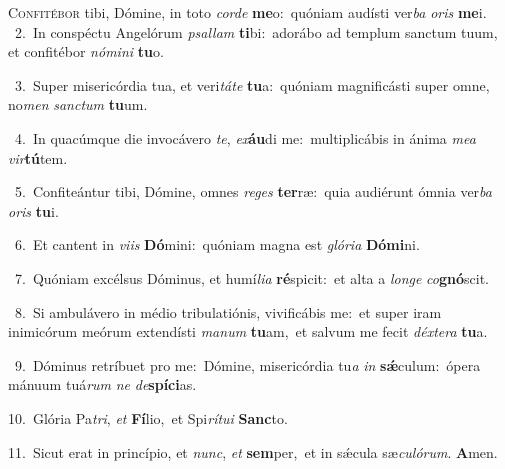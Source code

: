 \lettrine{\initial\textcolor{\initialcolor}{C}}{onfitébor} tibi, Dómine, in toto \textit{cor}\-\textit{de} \textbf{me}\-o:~\star quóniam audísti ver\textit{ba} \textit{o}\-\textit{ris} \textbf{me}\-i.\\
{\numbfont\textcolor{\numbcolor}{~2.}}~In conspéctu Angelórum \textit{psal}\-\textit{lam} \textbf{ti}\-bi:~\star adorábo ad templum sanctum tuum, et confitébor \textit{nó}\-\textit{mi}\textit{ni} \textbf{tu}\-o.\par
{\numbfont\textcolor{\numbcolor}{~3.}}~Super misericórdia tua, et veri\-\textit{tá}\-\textit{te} \textbf{tu}\-a:~\star quóniam magnificásti super omne, no\textit{men} \textit{sanc}\-\textit{tum} \textbf{tu}\-um.\par
{\numbfont\textcolor{\numbcolor}{~4.}}~In quacúmque die invocávero \textit{te}\-, \textit{ex}\-\textbf{áu}di me:~\star multiplicábis in ánima \textit{me}\-\textit{a} \textit{vir}\-\textbf{tú}tem.\par
{\numbfont\textcolor{\numbcolor}{~5.}}~Confiteántur tibi, Dómine, omnes \textit{re}\-\textit{ges} \textbf{ter}\-ræ:~\star quia audiérunt ómnia ver\textit{ba} \textit{o}\-\textit{ris} \textbf{tu}\-i.\par
{\numbfont\textcolor{\numbcolor}{~6.}}~Et cantent in \textit{vi}\-\textit{is} \textbf{Dó}\-mini:~\star quóniam magna est \textit{gló}\-\textit{ri}\textit{a} \textbf{Dó}\-\textbf{mi}ni.\par
{\numbfont\textcolor{\numbcolor}{~7.}}~Quóniam excélsus Dóminus, et humí\-\textit{li}\-\textit{a} \textbf{ré}\-spicit:~\star et alta a \textit{lon}\-\textit{ge} \textit{co}\-\textbf{gnó}scit.\par
{\numbfont\textcolor{\numbcolor}{~8.}}~Si ambulávero in médio tribulatiónis, vivificábis me:~\dagger et super iram inimicórum meórum extendísti \textit{ma}\-\textit{num} \textbf{tu}\-am,~\star et salvum me fecit \textit{déx}\-\textit{te}\textit{ra} \textbf{tu}\-a.\par
{\numbfont\textcolor{\numbcolor}{~9.}}~Dóminus retríbuet pro me:~\dagger Dómine, misericórdia tu\textit{a} \textit{in} \textbf{sǽ}\-culum:~\star ópera mánuum tuá\textit{rum} \textit{ne} \textit{de}\-\textbf{spí}\textbf{ci}as.\par
{\numbfont\textcolor{\numbcolor}{10.}}~Glória Pa\-\textit{tri}\-, \textit{et} \textbf{Fí}\-lio,~\star et Spi\-\textit{rí}\-\textit{tu}\textit{i} \textbf{Sanc}\-to.\par
{\numbfont\textcolor{\numbcolor}{11.}}~Sicut erat in princípio, et \textit{nunc}\-, \textit{et} \textbf{sem}\-per,~\star et in sǽcula sæ\-\textit{cu}\-\textit{ló}\textit{rum}. \textbf{A}\-men.\par
